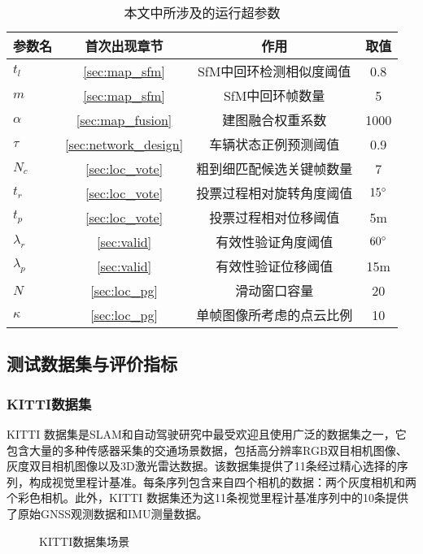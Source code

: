 \begin{table}
\centering
\caption{本文中所涉及的运行超参数}
\begin{tabular}{lccc}
\toprule
参数名 & 首次出现章节 & 作用 & 取值 \\
\midrule
$t_l$ & \ref{sec:map_sfm} & SfM中回环检测相似度阈值 & 0.8 \\
$m$ & \ref{sec:map_sfm} & SfM中回环帧数量 & 5 \\
$\alpha$ &  \ref{sec:map_fusion}  & 建图融合权重系数     & 1000 \\
$\tau$ & \ref{sec:network_design} & 车辆状态正例预测阈值 & 0.9 \\
$N_c$ & \ref{sec:loc_vote}  & 粗到细匹配候选关键帧数量 & 7   \\
$t_r$ &  \ref{sec:loc_vote}  & 投票过程相对旋转角度阈值 & $15\degree$   \\
$t_p$ &  \ref{sec:loc_vote}  & 投票过程相对位移阈值   & 5m    \\
$\lambda_r$ &  \ref{sec:valid}  & 有效性验证角度阈值    & $60\degree$   \\
$\lambda_p$ &  \ref{sec:valid}  & 有效性验证位移阈值    & 15m   \\
$N$ &  \ref{sec:loc_pg}  & 滑动窗口容量       & 20   \\
$\kappa$ &  \ref{sec:loc_pg}  & 单帧图像所考虑的点云比例 & 10  \\
\bottomrule
\end{tabular}
\label{tab:hyperparameters}
\end{table}

\subsection{测试数据集与评价指标}
\subsubsection{KITTI数据集}
KITTI 数据集\cite{Geiger2012CVPR}是SLAM和自动驾驶研究中最受欢迎且使用广泛的数据集之一，它包含大量的多种传感器采集的交通场景数据，包括高分辨率RGB双目相机图像、灰度双目相机图像以及3D激光雷达数据。该数据集提供了11条经过精心选择的序列，构成视觉里程计基准。每条序列包含来自四个相机的数据：两个灰度相机和两个彩色相机。此外，KITTI 数据集还为这11条视觉里程计基准序列中的10条提供了原始GNSS观测数据和IMU测量数据。

\begin{figure}
  \centering
  \caption{KITTI数据集场景}
  \label{fig:kitti_data}
\end{figure}

